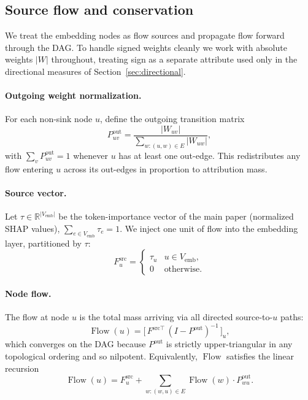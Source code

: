 \documentclass[11pt]{article}
\DeclareMathOperator{\Flow}{Flow}
\begin{document}
\subsection{Source flow and conservation}

We treat the embedding nodes as flow sources and propagate flow
forward through the DAG. To handle signed weights cleanly we work
with absolute weights $|W|$ throughout, treating sign as a separate
attribute used only in the directional measures of
Section~\ref{sec:directional}.

\paragraph{Outgoing weight normalization.}
For each non-sink node $u$, define the outgoing transition matrix
\begin{equation}
P^{\text{out}}_{uv} = \frac{|W_{uv}|}{\sum_{w : (u, w) \in E} |W_{uw}|},
\label{eq:Pout}
\end{equation}
with $\sum_v P^{\text{out}}_{uv} = 1$ whenever $u$ has at least one
out-edge. This redistributes any flow entering $u$ across its
out-edges in proportion to attribution mass.

\paragraph{Source vector.}
Let $\tau \in \mathbb{R}^{|V_{\text{emb}}|}$ be the token-importance
vector of the main paper (normalized SHAP values),
$\sum_{e \in V_{\text{emb}}} \tau_e = 1$. We inject one unit of
flow into the embedding layer, partitioned by $\tau$:
\begin{equation}
F^{\text{src}}_u =
\begin{cases}
\tau_u & u \in V_{\text{emb}}, \\
0      & \text{otherwise}.
\end{cases}
\label{eq:Fsrc}
\end{equation}

\paragraph{Node flow.}
The flow at node $u$ is the total mass arriving via all directed
source-to-$u$ paths:
\begin{equation}
\Flow(u) = \bigl[\, F^{\text{src}\top}\,(I - P^{\text{out}})^{-1}\,\bigr]_u,
\label{eq:flow}
\end{equation}
which converges on the DAG because $P^{\text{out}}$ is strictly
upper-triangular in any topological ordering and so nilpotent.
Equivalently, $\Flow$ satisfies the linear recursion
\begin{equation}
\Flow(u) = F^{\text{src}}_u + \sum_{w : (w, u) \in E} \Flow(w) \cdot P^{\text{out}}_{wu}.
\label{eq:flow-recursion}
\end{equation}
\end{document}
